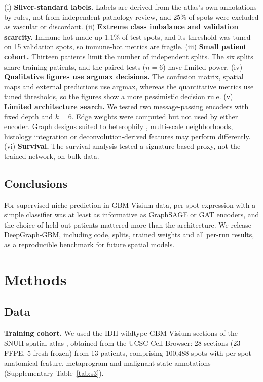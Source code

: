 \documentclass[11pt,letterpaper]{article}
\begin{document}
(i) \textbf{Silver-standard labels.} Labels are derived from the atlas's own annotations by rules, not from independent pathology review, and 25\% of spots were excluded as vascular or discordant. (ii) \textbf{Extreme class imbalance and validation scarcity.} Immune-hot made up 1.1\% of test spots, and its threshold was tuned on 15 validation spots, so immune-hot metrics are fragile. (iii) \textbf{Small patient cohort.} Thirteen patients limit the number of independent splits. The six splits share training patients, and the paired tests ($n = 6$) have limited power. (iv) \textbf{Qualitative figures use argmax decisions.} The confusion matrix, spatial maps and external predictions use argmax, whereas the quantitative metrics use tuned thresholds, so the figures show a more pessimistic decision rule. (v) \textbf{Limited architecture search.} We tested two message-passing encoders with fixed depth and $k = 6$. Edge weights were computed but not used by either encoder. Graph designs suited to heterophily \cite{zhu2020homophily}, multi-scale neighborhoods, histology integration \cite{hu2021spagcn} or deconvolution-derived features \cite{kleshchevnikov2022} may perform differently. (vi) \textbf{Survival.} The survival analysis tested a signature-based proxy, not the trained network, on bulk data.

\subsection{Conclusions}

For supervised niche prediction in GBM Visium data, per-spot expression with a simple classifier was at least as informative as GraphSAGE or GAT encoders, and the choice of held-out patients mattered more than the architecture. We release DeepGraph-GBM, including code, splits, trained weights and all per-run results, as a reproducible benchmark for future spatial models.

\section{Methods}

\subsection{Data}

\textbf{Training cohort.} We used the IDH-wildtype GBM Visium sections of the SNUH spatial atlas \cite{park2026}, obtained from the UCSC Cell Browser: 28 sections (23 FFPE, 5 fresh-frozen) from 13 patients, comprising 100{,}488 spots with per-spot anatomical-feature, metaprogram and malignant-state annotations (Supplementary Table~\ref{tab:s3}).
\end{document}
